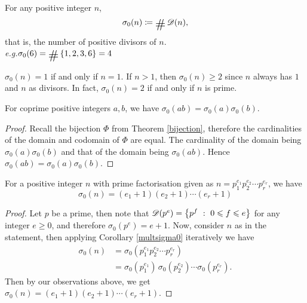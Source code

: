 \vspace*{1em}

\begin{definition}
For any positive integer $n$, 
\[\sigma_0(n) \coloneqq \card\,\mathscr{D}(n),\]
that is, the number of positive divisors of $n$.
\vspace*{0.5em}\\
\emph{e.g.}\quad $\sigma_0(6) = \card\set{1,2,3,6} = 4$
\end{definition}

\vspace*{0.5em}

\begin{remark}
$\sigma_0(n) = 1$ if and only if $n = 1$. If $n > 1$, then $\sigma_0(n) \geq 2$ since $n$ always has $1$ and $n$ as divisors. In fact, $\sigma_0(n) = 2$ if and only if $n$ is prime.
\end{remark}

\vspace*{1em}

\begin{corollary}\label{multsigma0}
For coprime positive integers $a,b$, we have $\sigma_0(ab) = \sigma_0(a)\sigma_0(b)$.
\end{corollary}
\begin{proof}
Recall the bijection $\Phi$ from Theorem \ref{bijection}, therefore the cardinalities of the domain and codomain of $\Phi$ are equal. The cardinality of the domain being $\sigma_0(a)\sigma_0(b)$ and that of the domain being $\sigma_0(ab)$. Hence $\sigma_0(ab) = \sigma_0(a)\sigma_0(b)$.
\end{proof}

\vspace*{0.5em}

\begin{corollary}\label{sigma0formula}
For a positive integer $n$ with prime factorisation given as $n = p_1^{e_1} p_2^{e_2}\cdots p_r^{e_r}$, we have
\[\sigma_0(n) = (e_1+1)(e_2+1)\cdots(e_r+1)\]
\end{corollary}
\begin{proof}
Let $p$ be a prime, then note that $\mathscr{D}(p^e) = \left\{p^f\ :\ 0\leqslant f \leqslant e\right\}$ for any integer $e\geq 0$, and therefore $\sigma_0(p^e) = e + 1$. Now, consider $n$ as in the statement, then applying Corollary \ref{multsigma0} iteratively we have
\begin{align*}
\sigma_0(n) &= \sigma_0(p_1^{e_1} p_2^{e_2}\cdots p_r^{e_r})\\[0.5em]
&= \sigma_0(p_1^{e_1})\, \sigma_0(p_2^{e_2})\cdots \sigma_0(p_r^{e_r}).
\end{align*}
Then by our observations above, we get $\sigma_0(n) = (e_1+1)(e_2+1)\cdots(e_r+1)$.
\end{proof}

